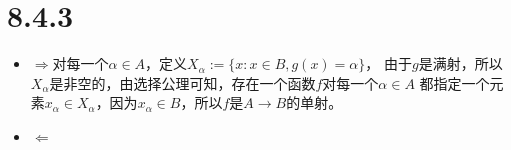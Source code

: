 \documentclass{article}
\begin{document}
\section*{8.4.3}

\begin{itemize}
  \item $\Rightarrow$对每一个$\alpha \in A$，定义$X_\alpha := \{ x : x \in B, g(x) = \alpha\}$，
        由于$g$是满射，所以$X_\alpha$是非空的，由选择公理可知，存在一个函数$f$对每一个$\alpha \in A$
        都指定一个元素$x_\alpha \in X_\alpha$，因为$x_\alpha \in B$，所以$f$是$A \rightarrow B$的单射。

  \item $\Leftarrow$
\end{itemize}
\end{document}
